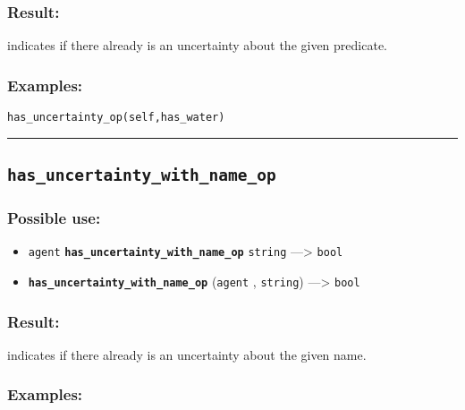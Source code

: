 \documentclass[]{book}
\providecommand{\tightlist}{%
  \setlength{\itemsep}{0pt}\setlength{\parskip}{0pt}}
\theoremstyle{definition}
\theoremstyle{definition}
\theoremstyle{definition}
\theoremstyle{remark}
\begin{document}
\subsubsection{Result:}\label{result-247}

indicates if there already is an uncertainty about the given predicate.

\subsubsection{Examples:}\label{examples-196}

\begin{verbatim}
has_uncertainty_op(self,has_water) 
\end{verbatim}

\begin{center}\rule{0.5\linewidth}{\linethickness}\end{center}

\subsection{\texorpdfstring{\texttt{has\_uncertainty\_with\_name\_op}}{has\_uncertainty\_with\_name\_op}}\label{has_uncertainty_with_name_op}

\subsubsection{Possible use:}\label{possible-use-257}

\begin{itemize}
\tightlist
\item
  \texttt{agent} \textbf{\texttt{has\_uncertainty\_with\_name\_op}}
  \texttt{string} ---\textgreater{} \texttt{bool}
\item
  \textbf{\texttt{has\_uncertainty\_with\_name\_op}} (\texttt{agent} ,
  \texttt{string}) ---\textgreater{} \texttt{bool}
\end{itemize}

\subsubsection{Result:}\label{result-248}

indicates if there already is an uncertainty about the given name.

\subsubsection{Examples:}\label{examples-197}
\end{document}
